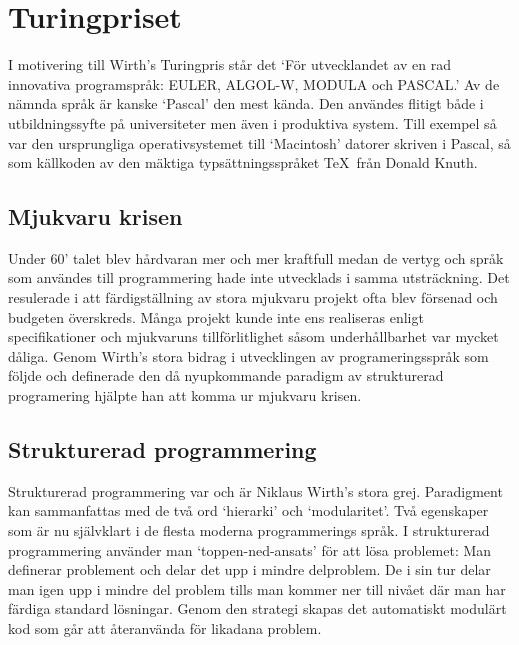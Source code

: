 \section{Turingpriset}
I motivering till Wirth's Turingpris står det `För utvecklandet av en rad 
innovativa programspråk: EULER, ALGOL-W, MODULA och PASCAL.' Av de nämnda språk 
är kanske `Pascal' den mest kända. Den användes flitigt både i utbildningssyfte 
på universiteter men även i produktiva system. Till exempel så var den ursprungliga
operativsystemet till `Macintosh' datorer skriven i Pascal, så som källkoden av
den mäktiga typsättningsspråket \TeX\ från Donald Knuth. 

\subsection{Mjukvaru krisen}
Under 60' talet blev hårdvaran mer och mer kraftfull medan de vertyg och språk som 
användes till programmering hade inte utvecklads i samma utsträckning. Det resulerade
i att färdigställning av stora mjukvaru projekt ofta blev försenad och budgeten
överskreds. Många projekt kunde inte ens realiseras enligt specifikationer 
och mjukvaruns tillförlitlighet såsom underhållbarhet var mycket
dåliga. Genom Wirth's stora bidrag i utvecklingen av programeringsspråk som följde
och definerade den då nyupkommande paradigm av strukturerad programering 
hjälpte han att komma ur mjukvaru krisen.

\subsection{Strukturerad programmering}
Strukturerad programmering var och är Niklaus Wirth's stora
grej. Paradigment kan sammanfattas med de två ord `hierarki' och
`modularitet'. Två egenskaper som är nu självklart i de flesta moderna
programmerings språk. I strukturerad programmering använder man
`toppen-ned-ansats'
för att lösa problemet: Man definerar problement och delar det upp i
mindre delproblem. De i sin tur delar man igen upp i mindre del
problem tills man kommer ner till nivået där man har färdiga standard
lösningar. Genom den strategi skapas det automatiskt modulärt kod
som går att återanvända för likadana problem.

